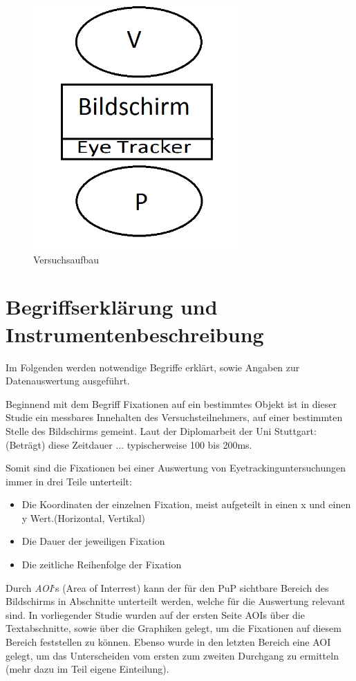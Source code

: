 \begin{figure}[H]
\noindent\hspace{0.5mm}\includegraphics[width=8cm]{./Ressourcen/Versuchsaufbau.png}
\caption{Versuchsaufbau}
\end{figure}

\section{Begriffserklärung und Instrumentenbeschreibung}
Im Folgenden werden notwendige Begriffe erklärt, sowie Angaben zur Datenauswertung ausgeführt.


Beginnend mit dem Begriff \grqq Fixationen auf ein bestimmtes Objekt \grqq ist in dieser Studie ein messbares Innehalten des Versuchsteilnehmers, auf einer bestimmten Stelle des Bildschirms gemeint. Laut der Diplomarbeit  der Uni Stuttgart: \grqq (Beträgt) diese Zeitdauer ... typischerweise 100 bis 200ms.\grqq

Somit sind die Fixationen bei einer Auswertung von Eyetrackinguntersuchungen immer in drei Teile unterteilt:
    \begin{itemize}
        \item Die Koordinaten der einzelnen Fixation, meist aufgeteilt in einen x und einen y Wert.(Horizontal, Vertikal)
        \item Die Dauer der jeweiligen Fixation
        \item Die zeitliche Reihenfolge der Fixation
    \end{itemize}


Durch \textit{AOI}`s (\grqq Area of Interrest\grqq) kann der für den \gls{PuP} sichtbare Bereich des Bildschirms in Abschnitte unterteilt werden, welche für die Auswertung relevant sind. In vorliegender Studie wurden auf der ersten Seite AOIs über die Textabschnitte, sowie über die Graphiken gelegt, um die Fixationen auf diesem Bereich feststellen zu können. Ebenso wurde in den letzten Bereich eine AOI gelegt, um das Unterscheiden vom ersten zum zweiten Durchgang zu ermitteln (mehr dazu im Teil eigene Einteilung).

